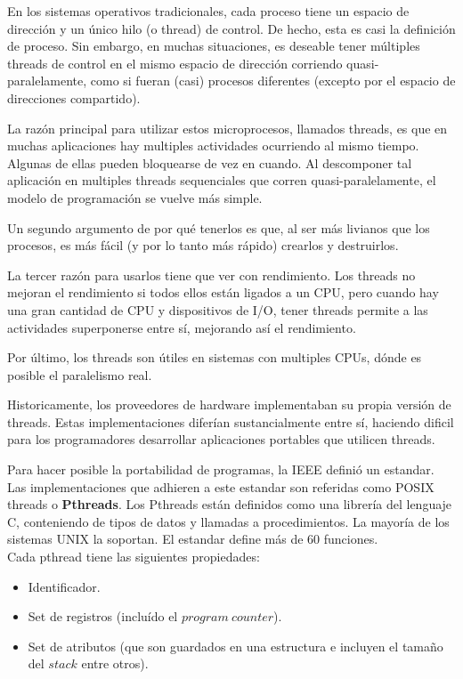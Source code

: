 En los sistemas operativos tradicionales, cada proceso tiene un espacio de dirección y un único hilo (o thread) de control. De hecho, esta es casi
la definición de proceso. Sin embargo, en muchas situaciones, es deseable tener múltiples threads de control en el mismo espacio de dirección corriendo 
quasi-paralelamente, como si fueran (casi) procesos diferentes (excepto por el espacio de direcciones compartido).

La razón principal para utilizar estos microprocesos, llamados threads, es que en muchas aplicaciones hay multiples actividades ocurriendo al mismo tiempo.
Algunas de ellas pueden bloquearse de vez en cuando. Al descomponer tal aplicación en multiples threads sequenciales que corren quasi-paralelamente, el 
modelo de programación se vuelve más simple.

Un segundo argumento de por qué tenerlos es que, al ser más livianos que los procesos, es más fácil (y por lo tanto más rápido) crearlos y destruirlos.

La tercer razón para usarlos tiene que ver con rendimiento. Los threads no mejoran el rendimiento si todos ellos están ligados a un CPU, pero cuando
hay una gran cantidad de CPU y dispositivos de I/O, tener threads permite a las actividades superponerse entre sí, mejorando así el rendimiento.

Por último, los threads son útiles en sistemas con multiples CPUs, dónde es posible el paralelismo real.

Historicamente, los proveedores de hardware implementaban su propia versión de threads. Estas implementaciones diferían sustancialmente entre sí, haciendo dificil
para los programadores desarrollar aplicaciones portables que utilicen threads.

Para hacer posible la portabilidad de programas, la IEEE definió un estandar. Las implementaciones que adhieren a este estandar son referidas como
POSIX threads o \textbf{Pthreads}. Los Pthreads están definidos como una librería del lenguaje C, conteniendo de tipos de datos y llamadas a procedimientos.
La mayoría de los sistemas UNIX la soportan. El estandar define más de 60 funciones.\\
Cada pthread tiene las siguientes propiedades:
\begin{itemize}
 \item Identificador.
 \item Set de registros (incluído el $program\ counter$).
 \item Set de atributos (que son guardados en una estructura e incluyen el tamaño del $stack$ entre otros).\\
\end{itemize}

